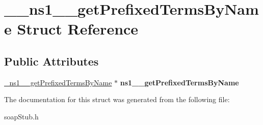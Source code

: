 \hypertarget{struct____ns1____getPrefixedTermsByName}{
\section{\_\-\_\-ns1\_\-\_\-getPrefixedTermsByName Struct Reference}
\label{struct____ns1____getPrefixedTermsByName}
}
\subsection*{Public Attributes}
\begin{DoxyCompactItemize}
\item 
\hypertarget{struct____ns1____getPrefixedTermsByName_a109bfaa2f5ad59af93e6d4efdd2e5699}{
\hyperlink{class__ns1____getPrefixedTermsByName}{\_\-ns1\_\-\_\-getPrefixedTermsByName} $\ast$ {\bfseries ns1\_\-\_\-getPrefixedTermsByName}}
\label{struct____ns1____getPrefixedTermsByName_a109bfaa2f5ad59af93e6d4efdd2e5699}

\end{DoxyCompactItemize}


The documentation for this struct was generated from the following file:\begin{DoxyCompactItemize}
\item 
soapStub.h\end{DoxyCompactItemize}
